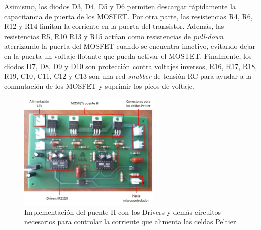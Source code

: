 Asimismo, los diodos D3, D4, D5 y D6 permiten descargar rápidamente la  capacitancia de puerta de los MOSFET. Por otra parte, las resistencias R4, R6, R12 y R14 limitan la corriente en la puerta del transistor. Además, las resistencias R5, R10 R13 y R15 actúan como resistencias de \textit{pull-down} aterrizando la puerta del MOSFET cuando se encuentra inactivo, evitando dejar en la puerta un voltaje flotante que pueda activar el MOSTET. Finalmente, los diodos D7, D8, D9 y D10 son protección contra voltajes inversos, R16, R17, R18, R19, C10, C11, C12 y C13 son  una red \textit{snubber} de tensión RC para ayudar a la conmutación de los MOSFET y suprimir los picos de voltaje. 
\begin{figure}[h!]
\begin{centering}
  \includegraphics[width=0.6\textwidth]{Images/Tarjeta.jpg}
  \caption{Implementación del puente H con los Drivers y demás circuitos necesarios para controlar la corriente que alimenta las celdas Peltier.}
  \label{fig:PCB}
  \par\end{centering}
\end{figure}
